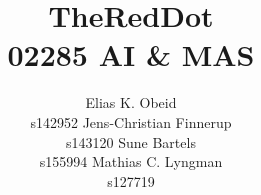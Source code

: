 \documentclass[letterpaper]{article}
\begin{document}
\title{TheRedDot\\02285 AI \& MAS}
\author{
Elias K. Obeid \\ s142952 \And
Jens-Christian Finnerup \\ s143120 \And 
Sune Bartels \\ s155994 \And 
Mathias C. Lyngman \\ s127719}

\maketitle










\end{document}
